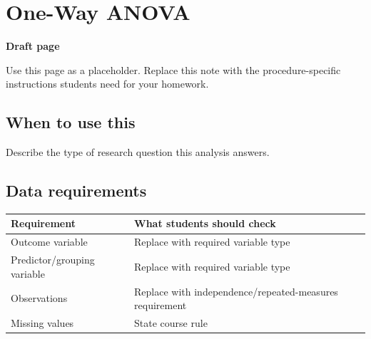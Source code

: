\documentclass[
  letterpaper,
  DIV=11,
  numbers=noendperiod]{scrreprt}
\newcounter{none} %
\begin{document}
\chapter{One-Way ANOVA}\label{one-way-anova}

\begin{tcolorbox}[enhanced jigsaw, arc=.35mm, bottomrule=.15mm, breakable, colback=white, colframe=quarto-callout-note-color-frame, left=2mm, leftrule=.75mm, opacityback=0, rightrule=.15mm, toprule=.15mm]
\begin{minipage}[t]{5.5mm}
\textcolor{quarto-callout-note-color}{\faInfo}
\end{minipage}%
\begin{minipage}[t]{\textwidth - 5.5mm}

\vspace{-3mm}\textbf{Draft page}\vspace{3mm}

Use this page as a placeholder. Replace this note with the
procedure-specific instructions students need for your homework.

\end{minipage}%
\end{tcolorbox}

\section{When to use this}\label{when-to-use-this-6}

Describe the type of research question this analysis answers.

\section{Data requirements}\label{data-requirements-7}

{\def\LTcaptype{none} %
\begin{longtable}[]{@{}
  >{\raggedright\arraybackslash}p{}
  >{\raggedright\arraybackslash}p{}@{}}
\toprule\noalign{}
\begin{minipage}[b]{\linewidth}\raggedright
Requirement
\end{minipage} & \begin{minipage}[b]{\linewidth}\raggedright
What students should check
\end{minipage} \\
\midrule\noalign{}
\endhead
\bottomrule\noalign{}
\endlastfoot
Outcome variable & Replace with required variable type \\
Predictor/grouping variable & Replace with required variable type \\
Observations & Replace with independence/repeated-measures
requirement \\
Missing values & State course rule \\
\end{longtable}
}
\end{document}

